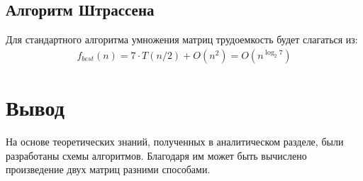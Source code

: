 \subsection{Алгоритм Штрассена}
Для стандартного алгоритма умножения матриц трудоемкость будет слагаться из:
\begin{equation}
	\label{сomplexity:str_best}
	\begin{aligned}
		f_{best}(n) = 7 \cdot T(n/2) + O(n^{2})=O(n^{\log _{2}7})
	\end{aligned}
\end{equation}

\section*{Вывод}

На основе теоретических знаний, полученных в аналитическом разделе, были разработаны схемы алгоритмов. 
Благодаря им может быть вычислено произведение двух матриц разними способами.
